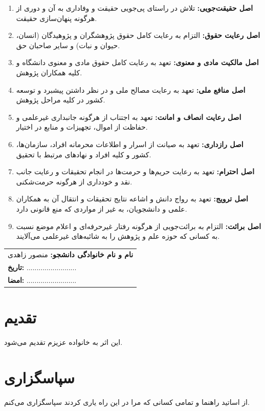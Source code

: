 \documentclass[a4paper,12pt]{report}
\renewcommand{\%}{\lr{\oldpercent}}
\begin{document}
\begin{enumerate}
    \item \textbf{اصل حقیقت‌جویی:} تلاش در راستای پی‌جویی حقیقت و وفاداری به آن و دوری از هرگونه پنهان‌سازی حقیقت.
    \item \textbf{اصل رعایت حقوق:} التزام به رعایت کامل حقوق پژوهشگران و پژوهیدگان (انسان، حیوان و نبات) و سایر صاحبان حق.
    \item \textbf{اصل مالکیت مادی و معنوی:} تعهد به رعایت کامل حقوق مادی و معنوی دانشگاه و کلیه همکاران پژوهش.
    \item \textbf{اصل منافع ملی:} تعهد به رعایت مصالح ملی و در نظر داشتن پیشبرد و توسعه کشور در کلیه مراحل پژوهش.
    \item \textbf{اصل رعایت انصاف و امانت:} تعهد به اجتناب از هرگونه جانبداری غیرعلمی و حفاظت از اموال، تجهیزات و منابع در اختیار.
    \item \textbf{اصل رازداری:} تعهد به صیانت از اسرار و اطلاعات محرمانه افراد، سازمان‌ها، کشور و کلیه افراد و نهادهای مرتبط با تحقیق.
    \item \textbf{اصل احترام:} تعهد به رعایت حریم‌ها و حرمت‌ها در انجام تحقیقات و رعایت جانب نقد و خودداری از هرگونه حرمت‌شکنی.
    \item \textbf{اصل ترویج:} تعهد به رواج دانش و اشاعه نتایج تحقیقات و انتقال آن به همکاران علمی و دانشجویان، به غیر از مواردی که منع قانونی دارد.
    \item \textbf{اصل برائت:} التزام به برائت‌جویی از هرگونه رفتار غیرحرفه‌ای و اعلام موضع نسبت به کسانی که حوزه علم و پژوهش را به شائبه‌های غیرعلمی می‌آلایند.
\end{enumerate}

\vspace{1cm}

\begin{flushleft}
\begin{tabular}{l}
\textbf{نام و نام خانوادگی دانشجو:} منصور زاهدی \\
\textbf{تاریخ:} ......................... \\
\textbf{امضا:} ......................... \\
\end{tabular}
\end{flushleft}

\newpage
\chapter*{تقدیم}
این اثر به خانواده عزیزم تقدیم می‌شود.
\newpage
\chapter*{سپاسگزاری}
از اساتید راهنما و تمامی کسانی که مرا در این راه یاری کردند سپاسگزاری می‌کنم.
\newpage
\begin{NoHyper}
\tableofcontents
\clearpage
{}
\listoftables
\clearpage
{}
\listoffigures
\end{NoHyper}
\clearpage
\end{document}
